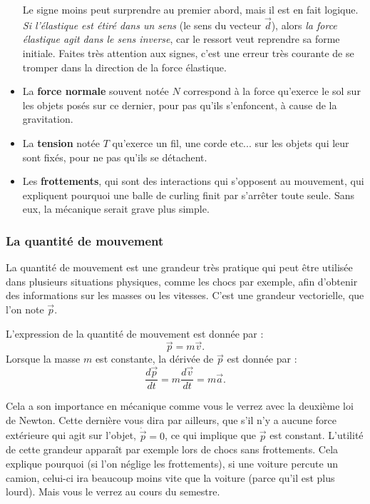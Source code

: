 \documentclass{article}
\begin{document}
\begin{itemize}
     \indent Le signe moins peut surprendre au premier abord, mais il est en fait logique. \textit{Si l'élastique est étiré dans un sens} (le sens du vecteur $\vec{d}$), alors \textit{la force élastique agit dans le sens inverse}, car le ressort veut reprendre sa forme initiale. Faites très attention aux signes, c'est une erreur très courante de se tromper dans la direction de la force élastique.
    \item La \textbf{force normale} souvent notée $N$ correspond à la force qu'exerce le sol sur les objets posés sur ce dernier, pour pas qu'ils s'enfoncent, à cause de la gravitation.

    \item La \textbf{tension} notée $T$ qu'exerce un fil, une corde etc... sur les objets qui leur sont fixés, pour ne pas qu'ils se détachent.
    \item Les \textbf{frottements}, qui sont des interactions qui s'opposent au mouvement, qui expliquent pourquoi une balle de curling finit par s'arrêter toute seule. Sans eux, la mécanique serait grave plus simple. 
\end{itemize}

\subsubsection{La quantité de mouvement}
La quantité de mouvement est une grandeur très pratique qui peut être utilisée dans plusieurs situations physiques, comme les chocs par exemple, afin d'obtenir des informations sur les masses ou les vitesses. C'est une grandeur vectorielle, que l'on note $\vec{p}.$ 
\begin{tcolorbox}[title=Expression de la quantité de mouvement]
L'expression de la quantité de mouvement est donnée par :\[\vec{p} =m\vec{v}.\]
Lorsque la masse $m$ est constante, la dérivée de $\vec p$ est donnée par : 
\[ \dfrac{d\vec{p}}{dt}=m \dfrac{d\vec{v}}{dt}=m\vec{a}.\]
\end{tcolorbox}

Cela a son importance en mécanique comme vous le verrez avec la deuxième loi de Newton.
Cette dernière vous dira par ailleurs, que s'il n'y a aucune force extérieure qui agit sur l'objet, $\dot{\vec{p}}=0$, ce qui implique que $ \vec{p}$ est constant. L'utilité de cette grandeur apparaît par exemple lors de chocs sans frottements. Cela explique pourquoi (si l'on néglige les frottements), si une voiture percute un camion, celui-ci ira beaucoup moins vite que la voiture (parce qu'il est plus lourd). Mais vous le verrez au cours du semestre. 
\end{document}
